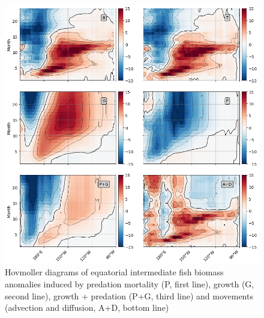 \begin{figure}[htp]
	\centering
	\includegraphics[scale=0.4]{figs/hov_compo_l_20.png}	
	\caption{Hovmoller diagrams of equatorial intermediate fish biomass anomalies induced by predation mortality (P, first line), growth (G, second line), growth + predation (P+G, third line) and movements (advection and diffusion, A+D, bottom line)}	
	\label{fig:hov_ape_trends_20}
\end{figure}

